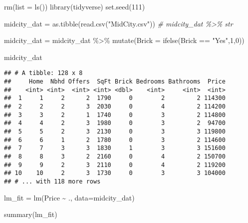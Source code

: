\documentclass[
]{article}
\newenvironment{Shaded}{\begin{snugshade}}{\end{snugshade}}
\newcommand{\AttributeTok}[1]{\textcolor[rgb]{0.77,0.63,0.00}{#1}}
\newcommand{\CommentTok}[1]{\textcolor[rgb]{0.56,0.35,0.01}{\textit{#1}}}
\newcommand{\DecValTok}[1]{\textcolor[rgb]{0.00,0.00,0.81}{#1}}
\newcommand{\FunctionTok}[1]{\textcolor[rgb]{0.00,0.00,0.00}{#1}}
\newcommand{\NormalTok}[1]{#1}
\newcommand{\OtherTok}[1]{\textcolor[rgb]{0.56,0.35,0.01}{#1}}
\newcommand{\SpecialCharTok}[1]{\textcolor[rgb]{0.00,0.00,0.00}{#1}}
\newcommand{\StringTok}[1]{\textcolor[rgb]{0.31,0.60,0.02}{#1}}
\begin{document}
\begin{Shaded}
\begin{Highlighting}[]
\FunctionTok{rm}\NormalTok{(}\AttributeTok{list =} \FunctionTok{ls}\NormalTok{())}
\FunctionTok{library}\NormalTok{(tidyverse)}
\FunctionTok{set.seed}\NormalTok{(}\DecValTok{111}\NormalTok{)}

\NormalTok{midcity\_dat }\OtherTok{=} \FunctionTok{as.tibble}\NormalTok{(}\FunctionTok{read.csv}\NormalTok{(}\StringTok{"MidCity.csv"}\NormalTok{))}
\CommentTok{\# midcity\_dat \%\textgreater{}\% str}

\NormalTok{midcity\_dat }\OtherTok{=}\NormalTok{ midcity\_dat }\SpecialCharTok{\%\textgreater{}\%} \FunctionTok{mutate}\NormalTok{(}\AttributeTok{Brick =} \FunctionTok{ifelse}\NormalTok{(Brick }\SpecialCharTok{==} \StringTok{"Yes"}\NormalTok{,}\DecValTok{1}\NormalTok{,}\DecValTok{0}\NormalTok{))}

\NormalTok{midcity\_dat}
\end{Highlighting}
\end{Shaded}

\begin{verbatim}
## # A tibble: 128 x 8
##     Home  Nbhd Offers  SqFt Brick Bedrooms Bathrooms  Price
##    <int> <int>  <int> <int> <dbl>    <int>     <int>  <int>
##  1     1     2      2  1790     0        2         2 114300
##  2     2     2      3  2030     0        4         2 114200
##  3     3     2      1  1740     0        3         2 114800
##  4     4     2      3  1980     0        3         2  94700
##  5     5     2      3  2130     0        3         3 119800
##  6     6     1      2  1780     0        3         2 114600
##  7     7     3      3  1830     1        3         3 151600
##  8     8     3      2  2160     0        4         2 150700
##  9     9     2      3  2110     0        4         2 119200
## 10    10     2      3  1730     0        3         3 104000
## # ... with 118 more rows
\end{verbatim}

\begin{Shaded}
\begin{Highlighting}[]
\NormalTok{lm\_fit }\OtherTok{=} \FunctionTok{lm}\NormalTok{(Price  }\SpecialCharTok{\textasciitilde{}}\NormalTok{ ., }\AttributeTok{data=}\NormalTok{midcity\_dat)}

\FunctionTok{summary}\NormalTok{(lm\_fit)}
\end{Highlighting}
\end{Shaded}
\end{document}
